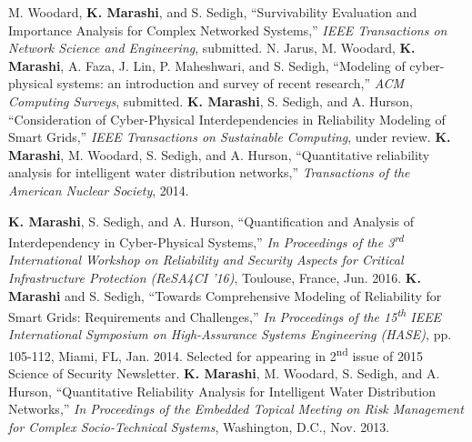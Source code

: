 \begin{cvpubs}
  \cvpub
    {M. Woodard, \textbf{K. Marashi}, and S. Sedigh, ``Survivability Evaluation and Importance Analysis for Complex Networked Systems,'' \textit{IEEE Transactions on Network Science and Engineering}, submitted.}
  \cvpub
    {N. Jarus, M. Woodard, \textbf{K. Marashi}, A. Faza, J. Lin, P. Maheshwari, and S. Sedigh, ``Modeling of cyber-physical systems: an introduction and survey of recent research,'' \textit{ACM Computing Surveys}, submitted.}
  \cvpub
    {\textbf{K. Marashi}, S. Sedigh, and A. Hurson, ``Consideration of Cyber-Physical Interdependencies in Reliability Modeling of Smart Grids,'' \textit{IEEE Transactions on Sustainable Computing}, under review.}
  \cvpub
    {\textbf{K. Marashi}, M. Woodard, S. Sedigh, and A. Hurson, ``Quantitative reliability analysis for intelligent water distribution networks,'' \textit{Transactions of the American Nuclear Society}, 2014.}
\end{cvpubs}

\begin{cvpubs}
  \cvpub
    {\textbf{K. Marashi}, S. Sedigh, and A. Hurson, ``Quantification and Analysis of Interdependency in Cyber-Physical Systems,'' \textit{In Proceedings of the 3\textsuperscript{rd} International Workshop on Reliability and Security Aspects for Critical Infrastructure Protection (ReSA4CI '16)}, Toulouse, France, Jun. 2016.}
  \cvpub
    {\textbf{K. Marashi} and S. Sedigh, ``Towards Comprehensive Modeling of Reliability for Smart Grids: Requirements and Challenges,'' \textit{In Proceedings of the 15\textsuperscript{th} IEEE International Symposium on High-Assurance Systems Engineering (HASE)}, pp. 105-112, Miami, FL, Jan. 2014. Selected for appearing in 2\textsuperscript{nd} issue of 2015 Science of Security Newsletter.}
  \cvpub
    {\textbf{K. Marashi}, M. Woodard, S. Sedigh, and A. Hurson, ``Quantitative Reliability Analysis for Intelligent Water Distribution Networks,'' \textit{In Proceedings of the Embedded Topical Meeting on Risk Management for Complex Socio-Technical Systems}, Washington, D.C., Nov. 2013.}
\end{cvpubs}
